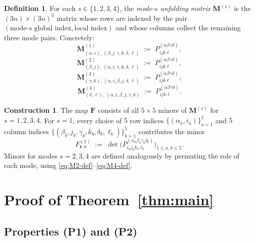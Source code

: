 \documentclass[12pt]{article}
\theoremstyle{definition}
\newtheorem{definition}[theorem]{Definition}
\newtheorem{construction}[theorem]{Construction}
\begin{document}
\begin{definition}
For each $s\in\{1,2,3,4\}$, the \emph{mode-$s$ unfolding matrix} $\mathbf{M}^{(s)}$ is the
$(3n)\times(3n)^3$ matrix whose rows are indexed by the pair $(\text{mode-}s\text{ global index}, \text{local index})$
and whose columns collect the remaining three mode pairs. Concretely:
\begin{equation}\label{eq:M1-def}
  \mathbf{M}^{(1)}_{(\alpha,i),\,(\beta,j,\gamma,k,\delta,\ell)} \;:=\; P^{(\alpha\beta\gamma\delta)}_{ijk\ell},
\end{equation}
\begin{equation}\label{eq:M2-def}
  \mathbf{M}^{(2)}_{(\beta,j),\,(\alpha,i,\gamma,k,\delta,\ell)} \;:=\; P^{(\alpha\beta\gamma\delta)}_{ijk\ell},
\end{equation}
\begin{equation}\label{eq:M3-def}
  \mathbf{M}^{(3)}_{(\gamma,k),\,(\alpha,i,\beta,j,\delta,\ell)} \;:=\; P^{(\alpha\beta\gamma\delta)}_{ijk\ell},
\end{equation}
\begin{equation}\label{eq:M4-def}
  \mathbf{M}^{(4)}_{(\delta,\ell),\,(\alpha,i,\beta,j,\gamma,k)} \;:=\; P^{(\alpha\beta\gamma\delta)}_{ijk\ell}.
\end{equation}
\end{definition}

\begin{construction}\label{const:F}
The map $\mathbf{F}$ consists of all $5\times5$ minors of $\mathbf{M}^{(s)}$ for $s=1,2,3,4$.
For $s=1$, every choice of $5$ row indices $\{(\alpha_a,i_a)\}_{a=1}^5$ and $5$ column indices
$\{(\beta_b,j_b,\gamma_b,k_b,\delta_b,\ell_b)\}_{b=1}^5$ contributes the minor
\begin{equation}\label{eq:minor-def}
  F^{(1)}_{\mathbf{r},\mathbf{c}}
  \;:=\;
  \det\!\bigl(P^{(\alpha_a\beta_b\gamma_b\delta_b)}_{i_a j_b k_b \ell_b}\bigr)_{1\leq a,b\leq 5}.
\end{equation}
Minors for modes $s=2,3,4$ are defined analogously by permuting the role of each mode,
using \eqref{eq:M2-def}--\eqref{eq:M4-def}.
\end{construction}

\section{Proof of Theorem~\ref{thm:main}}

\subsection{Properties (P1) and (P2)}
\end{document}
